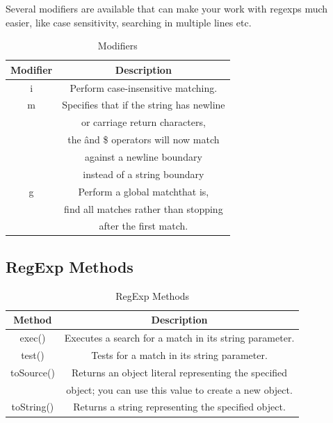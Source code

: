 \documentclass[11pt,a4paper]{article}
\begin{document}
Several modifiers are available that can make your work with regexps much easier, like case sensitivity, searching in multiple lines etc.
\begin{table}[ht]
\begin{center}
\begin{tabular}{| c | c |}\hline
\textbf{Modifier} & \textbf{Description}\\ \hline
i & Perform case-insensitive matching.\\ \hline
m &Specifies that if the string has newline\\
    & or carriage return characters,\\
    & the \^ and \$ operators will now match\\
    & against a newline boundary\\
    & instead of a string boundary\\ \hline
g & Perform a global matchthat is,\\
   & find all matches rather than stopping\\  
   & after the first match.\\ \hline
\end{tabular}
\caption{Modifiers}
\end{center}
\end{table}

\subsection*{RegExp Methods}

\begin{table}[ht]
\begin{center}
\begin{tabular}{| c | c |}\hline
\textbf{Method} &	\textbf{Description}\\ \hline
exec() & Executes a search for a match in its string parameter.\\ \hline
test() & Tests for a match in its string parameter.\\ \hline
toSource() & Returns an object literal representing the specified \\
                & object; you can use this value to create a new object.\\ \hline
toString() & Returns a string representing the specified object.\\ \hline
\end{tabular}
\caption{RegExp Methods}
\end{center}
\end{table}
\end{document}
